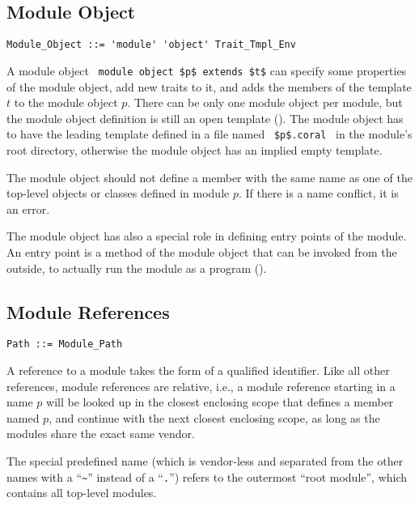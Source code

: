 \subsection{Module Object}

\syntax\begin{lstlisting}
Module_Object ::= 'module' 'object' Trait_Tmpl_Env
\end{lstlisting}

A module object ~\lstinline!module object $p$ extends $t$! can specify some properties of the module object, add new traits to it, and adds the members of the template $t$ to the module object $p$. There can be only one module object per module, but the module object definition is still an open template (). The module object has to have the leading template defined in a file named ~\lstinline!$p$.coral!~ in the module's root directory, otherwise the module object has an implied empty template. 

The module object should not define a member with the same name as one of the top-level objects or classes defined in module $p$. If there is a name conflict, it is an error. 

The module object has also a special role in defining entry points of the module. An entry point is a method of the module object that can be invoked from the outside, to actually run the module as a program (). 






\subsection{Module References}
\label{sec:module-refs}

\syntax\begin{lstlisting}
Path ::= Module_Path
\end{lstlisting}

A reference to a module takes the form of a qualified identifier. Like all other references, module references are relative, i.e., a module reference starting in a name $p$ will be looked up in the closest enclosing scope that defines a member named $p$, and continue with the next closest enclosing scope, as long as the modules share the exact same vendor. 

The special predefined name  (which is vendor-less and separated from the other names with a ``\lstinline!~!'' instead of a ``\lstinline!.!'') refers to the outermost ``root module'', which contains all top-level modules. 

